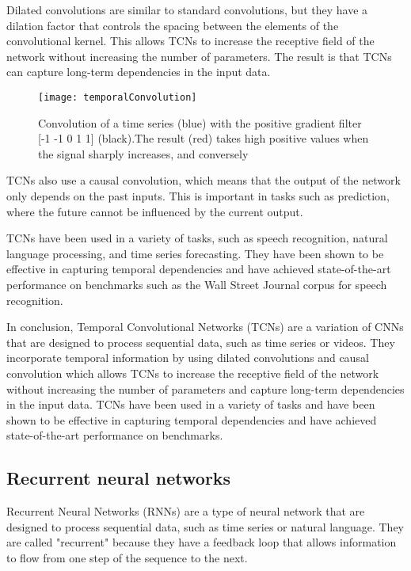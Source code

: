 Dilated convolutions are similar to standard convolutions, but they have a dilation factor that controls the spacing between the elements of the convolutional kernel.
This allows TCNs to increase the receptive field of the network without increasing the number of parameters.
The result is that TCNs can capture long-term dependencies in the input data.

\begin{figure}[H]
  \centering
  \texttt{[image: temporalConvolution]}
  \caption{Convolution of a time series (blue) with the positive gradient filter [-1 -1 0 1 1] (black).The result (red) takes high positive values when the signal sharply increases, and conversely\cite{tempCNN}}
\end{figure}

TCNs also use a causal convolution, which means that the output of the network only depends on the past inputs.
This is important in tasks such as prediction, where the future cannot be influenced by the current output.

TCNs have been used in a variety of tasks, such as speech recognition, natural language processing, and time series forecasting.
They have been shown to be effective in capturing temporal dependencies and have achieved state-of-the-art performance on benchmarks such as the Wall Street Journal corpus for speech recognition.

In conclusion, Temporal Convolutional Networks (TCNs) are a variation of CNNs that are designed to process sequential data, such as time series or videos.
They incorporate temporal information by using dilated convolutions and causal convolution which allows TCNs to increase the receptive field of the network without increasing the number of parameters and capture long-term dependencies in the input data.
TCNs have been used in a variety of tasks and have been shown to be effective in capturing temporal dependencies and have achieved state-of-the-art performance on benchmarks.


\subsection{Recurrent neural networks}

Recurrent Neural Networks (RNNs) \cite{graves2013generating, goodfellow2016deep} are a type of neural network that are designed to process sequential data, such as time series or natural language.
They are called "recurrent" because they have a feedback loop that allows information to flow from one step of the sequence to the next.

